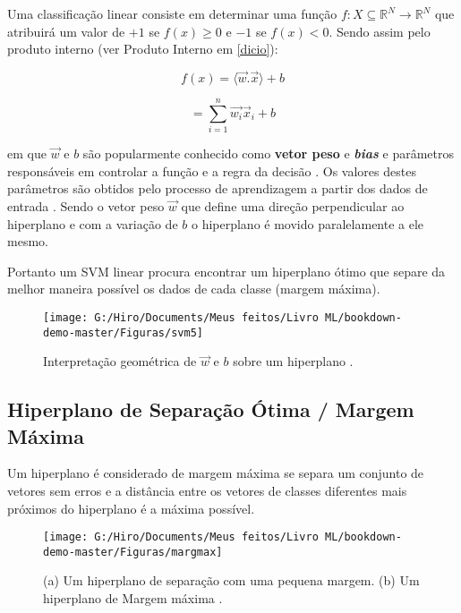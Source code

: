 \documentclass[
]{book}
\begin{document}
Uma classificação linear consiste em determinar uma função \(f: X \subseteq \mathbb{R}^N \rightarrow \mathbb{R}^N\) que atribuirá um valor de \(+1\) se \(f(x)\geq 0\) e \(-1\) se \(f(x)<0\). Sendo assim pelo produto interno (ver Produto Interno em \ref{dicio}):

\begin{equation}
f(x)= \langle\vec{w}.\vec{x}\rangle+b
\label{eq:classlin}
\end{equation}

\begin{equation}
= \displaystyle \sum^n_{i=1} \vec{w_i} \vec{x}_i+b
\label{eq:classlin2}
\end{equation}

em que \(\vec{w}\) e \(b\) são popularmente conhecido como \textbf{vetor peso} e \textbf{\emph{bias}} e parâmetros responsáveis em controlar a função e a regra da decisão \citep{lima2002maquinas}. Os valores destes parâmetros são obtidos pelo processo de aprendizagem a partir dos dados de entrada \citep{gonccalves2015maquina}. Sendo o vetor peso \(\vec{w}\) que define uma direção perpendicular ao hiperplano e com a variação de \(b\) o hiperplano é movido paralelamente a ele mesmo.

Portanto um SVM linear procura encontrar um hiperplano ótimo que separe da melhor maneira possível os dados de cada classe (margem máxima).

\begin{figure}

{\centering \texttt{[image: G:/Hiro/Documents/Meus feitos/Livro ML/bookdown-demo-master/Figuras/svm5]} 

}

\caption{Interpretação geométrica de \(\vec{w}\) e \(b\) sobre um hiperplano \citep{lima2002maquinas, gonccalves2015maquina}.}\label{fig:svm5}
\end{figure}



\hypertarget{margmax}{%
\subsection{Hiperplano de Separação Ótima / Margem Máxima}\label{margmax}}

Um hiperplano é considerado de margem máxima se separa um conjunto de vetores sem erros e a distância entre os vetores de classes diferentes mais próximos do hiperplano é a máxima possível.

\begin{figure}

{\centering \texttt{[image: G:/Hiro/Documents/Meus feitos/Livro ML/bookdown-demo-master/Figuras/margmax]} 

}

\caption{(a) Um hiperplano de separação com uma pequena margem. (b) Um hiperplano de Margem máxima \citep{da2009classificaccao}.}\label{fig:margmax}
\end{figure}
\end{document}
